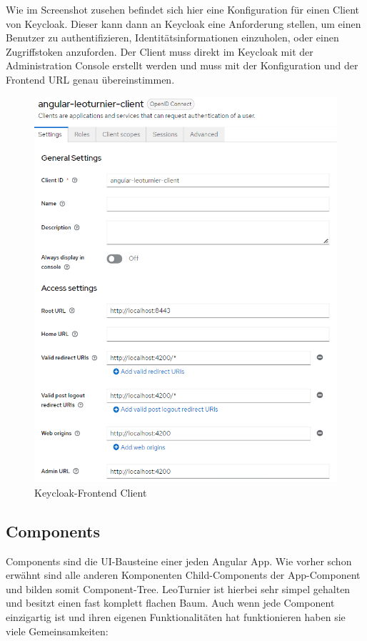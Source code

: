 Wie im Screenshot zusehen befindet sich hier eine Konfiguration für einen Client von Keycloak. Dieser kann dann an Keycloak eine Anforderung stellen, um einen Benutzer zu authentifizieren, Identitätsinformationen einzuholen, oder einen Zugriffstoken anzuforden.
Der Client muss direkt im Keycloak mit der Administration Console erstellt werden und muss mit der Konfiguration und der Frontend URL genau übereinstimmen.

\begin{figure}[H]
    \includegraphics[scale=0.7]{pics/frontend/keycloak_client.PNG}
    \caption{Keycloak-Frontend Client}
\end{figure}

\subsection{Components}
Components sind die UI-Bausteine einer jeden Angular App. Wie vorher schon erwähnt sind alle anderen Komponenten Child-Components der App-Component und bilden somit Component-Tree.
LeoTurnier ist hierbei sehr simpel gehalten und besitzt einen fast komplett flachen Baum. 
Auch wenn jede Component einzigartig ist und ihren eigenen Funktionalitäten hat funktionieren haben sie viele Gemeinsamkeiten:

